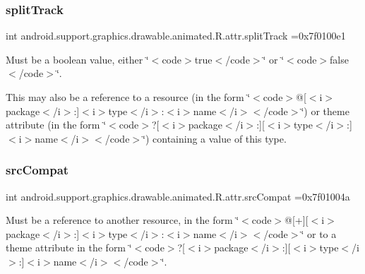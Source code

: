 \subsubsection{\texorpdfstring{split\+Track}{splitTrack}}
{\footnotesize\ttfamily int android.\+support.\+graphics.\+drawable.\+animated.\+R.\+attr.\+split\+Track =0x7f0100e1\hspace{0.3cm}{\ttfamily [static]}}

Must be a boolean value, either \char`\"{}$<$code$>$true$<$/code$>$\char`\"{} or \char`\"{}$<$code$>$false$<$/code$>$\char`\"{}. 

This may also be a reference to a resource (in the form \char`\"{}$<$code$>$@\mbox{[}$<$i$>$package$<$/i$>$\+:\mbox{]}$<$i$>$type$<$/i$>$\+:$<$i$>$name$<$/i$>$$<$/code$>$\char`\"{}) or theme attribute (in the form \char`\"{}$<$code$>$?\mbox{[}$<$i$>$package$<$/i$>$\+:\mbox{]}\mbox{[}$<$i$>$type$<$/i$>$\+:\mbox{]}$<$i$>$name$<$/i$>$$<$/code$>$\char`\"{}) containing a value of this type. \mbox{\label{classandroid_1_1support_1_1graphics_1_1drawable_1_1animated_1_1R_1_1attr_ae34c879d1fbb43eafabfe58b2bbde3a8}} 
\subsubsection{\texorpdfstring{src\+Compat}{srcCompat}}
{\footnotesize\ttfamily int android.\+support.\+graphics.\+drawable.\+animated.\+R.\+attr.\+src\+Compat =0x7f01004a\hspace{0.3cm}{\ttfamily [static]}}

Must be a reference to another resource, in the form \char`\"{}$<$code$>$@\mbox{[}+\mbox{]}\mbox{[}$<$i$>$package$<$/i$>$\+:\mbox{]}$<$i$>$type$<$/i$>$\+:$<$i$>$name$<$/i$>$$<$/code$>$\char`\"{} or to a theme attribute in the form \char`\"{}$<$code$>$?\mbox{[}$<$i$>$package$<$/i$>$\+:\mbox{]}\mbox{[}$<$i$>$type$<$/i$>$\+:\mbox{]}$<$i$>$name$<$/i$>$$<$/code$>$\char`\"{}. \mbox{\label{classandroid_1_1support_1_1graphics_1_1drawable_1_1animated_1_1R_1_1attr_a8c29656aa71891095bd178c4b06eb8d0}} 
